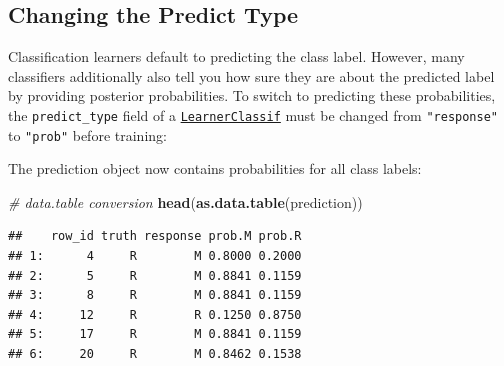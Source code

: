 \documentclass[]{scrbook}
\newenvironment{Shaded}{\begin{snugshade}}{\end{snugshade}}
\newcommand{\CommentTok}[1]{\textcolor[rgb]{0.56,0.35,0.01}{\textit{#1}}}
\newcommand{\DataTypeTok}[1]{\textcolor[rgb]{0.13,0.29,0.53}{#1}}
\newcommand{\KeywordTok}[1]{\textcolor[rgb]{0.13,0.29,0.53}{\textbf{#1}}}
\newcommand{\NormalTok}[1]{#1}
\newcommand{\OperatorTok}[1]{\textcolor[rgb]{0.81,0.36,0.00}{\textbf{#1}}}
\newcommand{\StringTok}[1]{\textcolor[rgb]{0.31,0.60,0.02}{#1}}
\renewenvironment{Shaded} {\begin{snugshade}\small} {\end{snugshade}}
\begin{document}
\hypertarget{predict-type}{%
\subsection{Changing the Predict Type}\label{predict-type}}

Classification learners default to predicting the class label.
However, many classifiers additionally also tell you how sure they are about the predicted label by providing posterior probabilities.
To switch to predicting these probabilities, the \texttt{predict\_type} field of a \href{https://mlr3.mlr-org.com/reference/LearnerClassif.html}{\texttt{LearnerClassif}} must be changed from \texttt{"response"} to \texttt{"prob"} before training:

\begin{Shaded}
\end{Shaded}

The prediction object now contains probabilities for all class labels:

\begin{Shaded}
\begin{Highlighting}[]
\CommentTok{# data.table conversion}
\KeywordTok{head}\NormalTok{(}\KeywordTok{as.data.table}\NormalTok{(prediction))}
\end{Highlighting}
\end{Shaded}

\begin{verbatim}
##    row_id truth response prob.M prob.R
## 1:      4     R        M 0.8000 0.2000
## 2:      5     R        M 0.8841 0.1159
## 3:      8     R        M 0.8841 0.1159
## 4:     12     R        R 0.1250 0.8750
## 5:     17     R        M 0.8841 0.1159
## 6:     20     R        M 0.8462 0.1538
\end{verbatim}

\begin{Shaded}
\end{Shaded}
\end{document}
